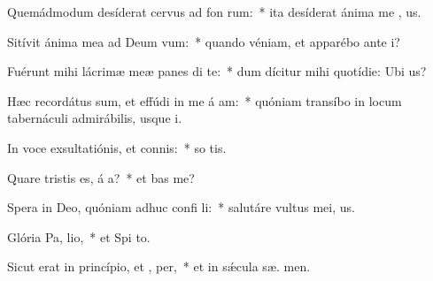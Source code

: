 \item Quemádmodum desíderat cervus ad fon rum:~* ita desíderat ánima me  , us.
\item Sitívit ánima mea ad Deum  vum:~* quando véniam, et apparébo ante  i?
\item Fuérunt mihi lácrimæ meæ panes di  te:~* dum dícitur mihi quotídie: Ubi   us?
\item Hæc recordátus sum, et effúdi in me á am:~* quóniam transíbo in locum tabernáculi admirábilis, usque   i.
\item In voce exsultatiónis, et connis:~* so tis.
\item Quare tristis es, á a?~* et  bas me?
\item Spera in Deo, quóniam adhuc confi li:~* salutáre vultus mei,   us.
\item Glória Pa,  lio,~* et Spi to.
\item Sicut erat in princípio, et ,  per,~* et in sǽcula sæ. men.
